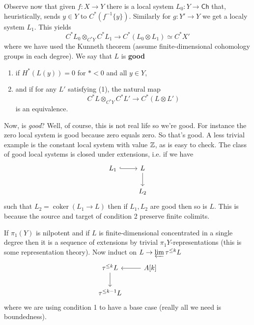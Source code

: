 \documentclass{amsart}
\DeclareMathOperator{\coker}{coker}
\begin{document}
Observe now that given $f:X\to Y$ there is a local system $L_0:Y\to\mathsf{Ch}$ that,
heuristically, sends $y\in Y$ to $C^*(f^{-1}\{y\})$.  Similarly for $g:Y'\to Y$
we get a localy system $L_1$.
This yields
\begin{equation*}
    C^*L_0\otimes_{C^*Y}C^*L_1 \to C^*(L_0\otimes L_1)\simeq C^*X'
\end{equation*}
where we have used the Kunneth theorem (assume finite-dimensional cohomology groups
in each degree). We say that $L$ is \textbf{good}
\begin{enumerate}
    \item if $H^*(L(y))=0$ for $*<0$ and all $y\in Y$,
    \item and if for any $L'$ satisfying (1), the natural map
        \begin{equation*}
            C^*L\otimes_{C^*Y}C^*L'\to C^*(L\otimes L')
        \end{equation*}
        is an equivalence.
\end{enumerate}
Now, is \textit{good}? Well, of course, this is not real life so we're good. For instance
the zero local system is good because zero equals zero. So that's good. A less trivial
example is the constant local system with value $\mathbb{Z}$, as is easy to check.
The class of good local systems is closed under extensions, i.e. if we have
\begin{equation*}
    \begin{tikzcd}
        L_1 \rar[hook] & L\dar \\
        & L_2
    \end{tikzcd}
\end{equation*}
such that $L_2=\coker(L_1\to L)$ then if $L_1,L_2$ are good then so is $L$. This is
because the source and target of condition 2 preserve finite colimits.

If $\pi_1(Y)$ is nilpotent and if $L$ is finite-dimensional concentrated in
a single degree then it is a sequence of extensions by trivial $\pi_1Y$-representations
(this is some representation theory). Now induct on $L\to \varprojlim\tau^{\leq k}L$
\begin{equation*}
    \begin{tikzcd}
        \tau^{\leq k}L\dar & A[k]\lar \\
        \tau^{\leq k-1}L
    \end{tikzcd}
\end{equation*}
where we are using condition 1 to have a base case (really all we need is boundedness).
\end{document}
